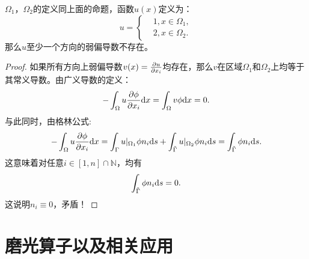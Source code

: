     \begin{proposition}
        $\Omega_{1}$，$\Omega_{2}$的定义同上面的命题，函数$u(x)$定义为：
        \begin{equation}
            u=\left\{
                \begin{aligned}
                    &1,x\in\Omega_{1},\\
                    &2,x\in\Omega_{2}.
                \end{aligned}
            \right.
        \end{equation}
        那么$u$至少一个方向的弱偏导数不存在。
    \end{proposition}
\begin{proof}
    如果所有方向上弱偏导数$v(x)=\frac{\partial u}{\partial x_{i}}$均存在，那么$v$在区域$\Omega_{1}$和$\Omega_{2}$上均等于其常义导数。由广义导数的定义：
    \begin{equation}
        -\int_{\Omega}u\frac{\partial \phi}{\partial x_{i}}\mathrm{d} x=\int_{\Omega}v\phi\mathrm{d} x=0.
    \end{equation}
    与此同时，由格林公式:
    \begin{equation}
        -\int_{\Omega}u\frac{\partial \phi}{\partial x_{i}}\mathrm{d} x=\int_{\Gamma}u|_{\Omega_{1}}\phi n_{i}\mathrm{d} s+\int_{\tilde{\Gamma}}u|_{\Omega_{2}}\phi n_{i}\mathrm{d} s=\int_{\tilde{\Gamma}}\phi n_{i}\mathrm{d} s.
    \end{equation}
    这意味着对任意$i\in [1,n]\cap\mathbb{N}$，均有
    \begin{equation}
        \int_{\tilde{\Gamma}}\phi n_{i}\mathrm{d} s=0.
    \end{equation}
    这说明$n_{i}\equiv 0$，矛盾！
\end{proof}
\section{磨光算子以及相关应用}
